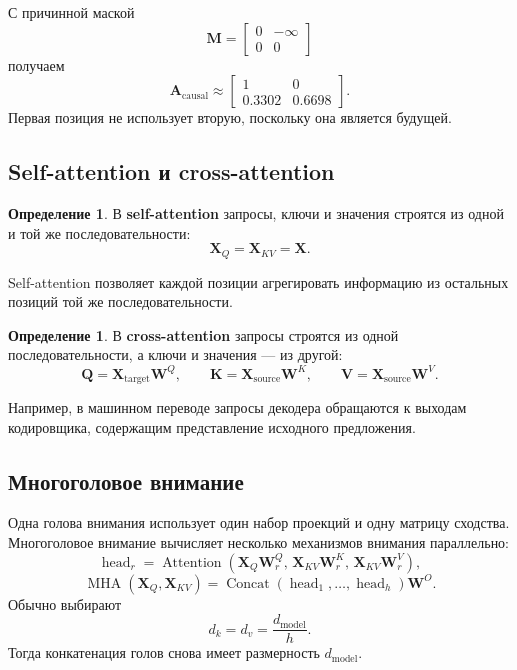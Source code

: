 \documentclass[12pt,a4paper]{article}
\theoremstyle{definition}
\newtheorem{definition}[theorem]{Определение}
\newcommand{\1}{\mathbf{1}}
\begin{document}
С причинной маской
\[
    \bm{M}
    =
    \begin{bmatrix}
        0&-\infty\\
        0&0
    \end{bmatrix}
\]
получаем
\[
    \bm{A}_{\text{causal}}
    \approx
    \begin{bmatrix}
        1&0\\
        0.3302&0.6698
    \end{bmatrix}.
\]
Первая позиция не использует вторую, поскольку она является будущей.

\subsection{Self-attention и cross-attention}

\begin{definition}
В \textbf{self-attention} запросы, ключи и значения строятся из одной
и той же последовательности:
\[
    \bm{X}_Q=\bm{X}_{KV}=\bm{X}.
\]
\end{definition}

Self-attention позволяет каждой позиции агрегировать информацию из
остальных позиций той же последовательности.

\begin{definition}
В \textbf{cross-attention} запросы строятся из одной
последовательности, а ключи и значения --- из другой:
\[
    \bm{Q}=\bm{X}_{\text{target}}\bm{W}^Q,
    \qquad
    \bm{K}=\bm{X}_{\text{source}}\bm{W}^K,
    \qquad
    \bm{V}=\bm{X}_{\text{source}}\bm{W}^V.
\]
\end{definition}

Например, в машинном переводе запросы декодера обращаются к выходам
кодировщика, содержащим представление исходного предложения.

\subsection{Многоголовое внимание}

Одна голова внимания использует один набор проекций и одну матрицу
сходства. Многоголовое внимание вычисляет несколько механизмов
внимания параллельно:
\[
    \operatorname{head}_r
    =
    \operatorname{Attention}
    \left(
        \bm{X}_Q\bm{W}_r^Q,\,
        \bm{X}_{KV}\bm{W}_r^K,\,
        \bm{X}_{KV}\bm{W}_r^V
    \right),
\]
\[
    \operatorname{MHA}(\bm{X}_Q,\bm{X}_{KV})
    =
    \operatorname{Concat}
    (\operatorname{head}_1,\ldots,\operatorname{head}_h)\bm{W}^O.
\]
Обычно выбирают
\[
    d_k=d_v=\frac{d_{\text{model}}}{h}.
\]
Тогда конкатенация голов снова имеет размерность
$d_{\text{model}}$.
\end{document}
